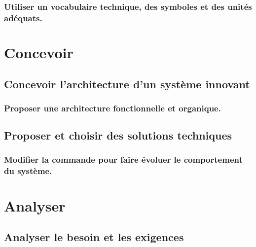 \documentclass[10pt,fleqn]{book}
\begin{document}
\subsection{Utiliser un vocabulaire technique, des symboles et des unités adéquats.} 

\begin{multicols}{2} 

\end{multicols}

\chapter{Concevoir} 

\section{Concevoir l'architecture d'un système innovant} 

\subsection{Proposer une architecture fonctionnelle et organique.} 

\begin{multicols}{2} 

\end{multicols}

\section{Proposer et choisir des solutions techniques} 

\subsection{Modifier la commande pour faire évoluer le comportement du système. } 

\begin{multicols}{2} 

\end{multicols}

\proftrue

\chapter{Analyser} 

\section{Analyser le besoin et les exigences} 
\end{document}
